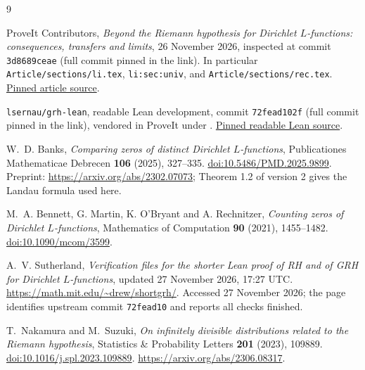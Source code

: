 \documentclass[11pt]{article}
\theoremstyle{definition}
\begin{document}
\begin{thebibliography}{9}
\raggedright
{}

ProveIt Contributors,
\emph{Beyond the Riemann hypothesis for Dirichlet $L$-functions:
consequences, transfers and limits},
26 November 2026, inspected at commit
\texttt{3d8689ceae} (full commit pinned in the link).
In particular \texttt{Article/sections/li.tex},
\texttt{li:sec:univ}, and \texttt{Article/sections/rec.tex}.
\href{https://github.com/VladimirReshetnikov/ProveIt/tree/3d8689ceae76501a5c50f67da37e85369aac4fb6/Analysis/GeneralizedRiemannHypothesis/Article}{Pinned article source}.

\texttt{lsernau/grh-lean}, readable Lean development,
commit \texttt{72fead102f} (full commit pinned in the link),
vendored in ProveIt under
.
\href{https://github.com/lsernau/grh-lean/tree/72fead102f663d5c7a407964a13dc0cf9d977207/grh}{Pinned readable Lean source}.

W.~D. Banks,
\emph{Comparing zeros of distinct Dirichlet $L$-functions},
Publicationes Mathematicae Debrecen \textbf{106} (2025), 327--335.
\href{https://doi.org/10.5486/PMD.2025.9899}{doi:10.5486/PMD.2025.9899}.
Preprint: \url{https://arxiv.org/abs/2302.07073};
Theorem 1.2 of version 2 gives the Landau formula used here.

M.~A. Bennett, G. Martin, K. O'Bryant and A. Rechnitzer,
\emph{Counting zeros of Dirichlet $L$-functions},
Mathematics of Computation \textbf{90} (2021), 1455--1482.
\href{https://doi.org/10.1090/mcom/3599}{doi:10.1090/mcom/3599}.

A.~V. Sutherland,
\emph{Verification files for the shorter Lean proof of RH and of GRH for
Dirichlet $L$-functions}, updated 27 November 2026, 17:27 UTC.
\url{https://math.mit.edu/~drew/shortgrh/}.
Accessed 27 November 2026; the page identifies upstream commit
\texttt{72fead10} and reports all checks finished.

T.~Nakamura and M.~Suzuki,
\emph{On infinitely divisible distributions related to the Riemann hypothesis},
Statistics \& Probability Letters \textbf{201} (2023), 109889.
\href{https://doi.org/10.1016/j.spl.2023.109889}{doi:10.1016/j.spl.2023.109889}.
\url{https://arxiv.org/abs/2306.08317}.

\end{thebibliography}
\end{document}
